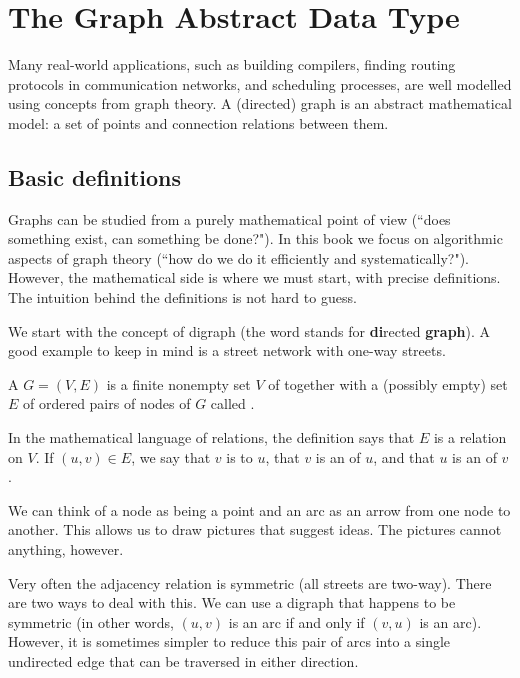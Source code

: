\chapter{The Graph Abstract Data Type}
\label{ch:graphadt}

Many real-world applications, such as building compilers, finding routing
protocols in communication networks, and scheduling processes, are well
modelled using concepts from graph theory. A (directed) graph is an
abstract mathematical model:  a set of points and connection relations
between them.

\section{Basic definitions}
\label{sec:graphdefs}

Graphs can be studied from a purely mathematical point of view (``does
something exist, can something be done?"). In this book we focus on
algorithmic aspects of graph theory (``how do we do it efficiently and
systematically?").  However, the mathematical side is where we must
start, with precise definitions. The intuition behind the definitions is
not hard to guess.

We start with the concept of digraph (the word stands for
\textbf{di}rected \textbf{graph}). A good example to keep in mind 
is a street network with one-way streets. 

\begin{Definition}\label{def:digraph} 
A  $G=(V,E)$ is a  finite nonempty set $V$ of
 together with a (possibly empty) set $E$ of ordered pairs
of nodes of $G$ called .
\end{Definition}

\begin{note}   
In the mathematical language of relations, the definition says that
$E$ is a relation on $V$. If $(u, v)\in E$, we say that $v$ is  
to $u$, that $v$ is an  of $u$, and that $u$ is an 
 of $v$.

We can think of a node as being a point and an arc as an arrow from one 
node to another. This allows us to draw pictures that suggest ideas. The 
pictures cannot  anything, however.
\end{note}

Very often the adjacency relation is symmetric (all streets are
two-way). There are two ways to deal with this. We can use a digraph
that happens to be symmetric (in other words, $(u, v)$ is an arc if and
only if $(v, u)$ is an arc). However, it is sometimes simpler to reduce
this pair of arcs into a single undirected edge that can be traversed in
either direction.

